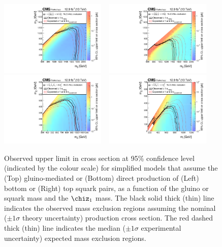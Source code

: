 \begin{figure}[thp!]
  \begin{center}
    \includegraphics[width=0.45\textwidth]{./Figures/statisticalResults/SUS16T1bbbbXSEC.pdf} ~
    \includegraphics[width=0.45\textwidth]{./Figures/statisticalResults/SUS16T1ttttXSEC.pdf} \\
    \includegraphics[width=0.45\textwidth]{./Figures/statisticalResults/SUS16T2bbXSEC.pdf} ~
    \includegraphics[width=0.45\textwidth]{./Figures/statisticalResults/SUS16T2ttXSEC.pdf} 
    \caption{Observed upper limit in cross section at 95\% confidence
      level (indicated by the colour scale) for simplified models that
      assume the (Top) gluino-mediated or (Bottom) direct production
      of (Left) bottom or (Right) top squark pairs, as a function of
      the gluino or squark mass and the $\chiz_{1}$ 
      mass. The black solid thick (thin) line indicates the observed
      mass exclusion regions assuming the nominal (${\pm}1 \sigma$
      theory uncertainty) production cross section. The red dashed
      thick (thin) line indicates the median (${\pm}1 \sigma$
      experimental uncertainty) expected mass exclusion
      regions. 
      \label{fig:limits-sms} }
  \end{center}
\end{figure}
